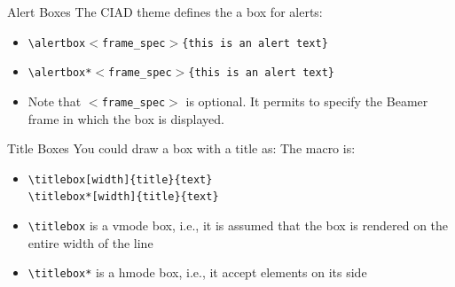 \documentclass[english,sectioncirclenumberstyle]{ciadbeamer}
\begin{document}
\begin{frame}{Alert Boxes}
	The CIAD theme defines the a box for alerts: \\
	\begin{itemize}
	\item \texttt{{\textbackslash}alertbox\ensuremath{<}frame\_spec\ensuremath{>}\{this is an alert text\}} \\[.5cm]
		\vspace{1cm}
	\item \texttt{{\textbackslash}alertbox*\ensuremath{<}frame\_spec\ensuremath{>}\{this is an alert text\}} \\[.5cm]
	\item Note that \texttt{\ensuremath{<}frame\_spec\ensuremath{>}} is optional. It permits to specify the Beamer frame in which the box is displayed.
	\end{itemize}
\end{frame}

\begin{frame}{Title Boxes}
	You could draw a box with a title as:
	The macro is:	
	\begin{itemize}
	\item \texttt{{\textbackslash}titlebox[width]\{title\}\{text\}} \\
		\texttt{{\textbackslash}titlebox*[width]\{title\}\{text\}} \\[.5cm]
	\item \texttt{{\textbackslash}titlebox} is a vmode box, i.e., it is assumed that the box is rendered on the entire width of the line
	\item \texttt{{\textbackslash}titlebox*} is a hmode box, i.e., it accept elements on its side
	\end{itemize}
\end{frame}
\end{document}
